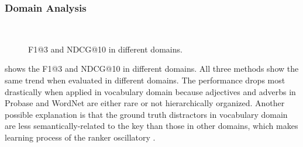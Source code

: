 \subsubsection*{Domain Analysis}
\begin{figure}[hb!]
	\centering
	 \caption{F1@3 and NDCG@10 in different domains.} \label{fig:domains}
\end{figure}

 shows the F1@3 and NDCG@10 in different domains. All three methods show the same trend when evaluated in different domains. The performance drops most drastically when applied in vocabulary domain because adjectives and adverbs in Probase and WordNet are either rare or not hierarchically organized. Another possible explanation is that the ground truth distractors in vocabulary domain are less semantically-related to the key than those in other domains, which makes learning process of the ranker oscillatory .

